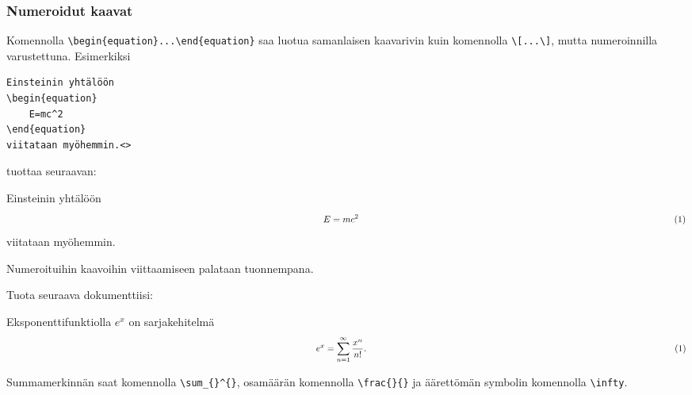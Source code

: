 \begin{fframe}
    \frametitle{Numeroidut kaavat}
Komennolla \lstinline-\begin{equation}...\end{equation}- saa luotua samanlaisen kaavarivin kuin komennolla \lstinline-\[...\]-, mutta numeroinnilla varustettuna. \pause Esimerkiksi

    \begin{lstlisting}
Einsteinin yhtälöön
\begin{equation}
    E=mc^2
\end{equation}
viitataan myöhemmin.<>
    \end{lstlisting}
    tuottaa seuraavan:
    \begin{sample}
        Einsteinin yhtälöön
        \begin{equation*}
            \hskip\textwidth minus \textwidth E=mc^2 \hskip\textwidth minus \textwidth (1)
        \end{equation*}
        viitataan myöhemmin.
    \end{sample}
    \pause
    Numeroituihin kaavoihin viittaamiseen palataan tuonnempana.
\end{fframe}

\begin{fframe}
    \begin{harj}
        \label{viittausTehtava}
        Tuota seuraava dokumenttiisi:
        \begin{sample}
            Eksponenttifunktiolla \(e^x\) on sarjakehitelmä
            \begin{equation*}
                \hskip\textwidth minus \textwidth e^x=\sum_{n=1}^\infty\frac{x^n}{n!}.\hskip\textwidth minus \textwidth (1)
            \end{equation*}
        \end{sample}
        Summamerkinnän saat komennolla \lstinline-\sum_{}^{}-, osamäärän komennolla \lstinline-\frac{}{}- ja äärettömän symbolin komennolla \lstinline-\infty-. 
    \end{harj}
\end{fframe}


